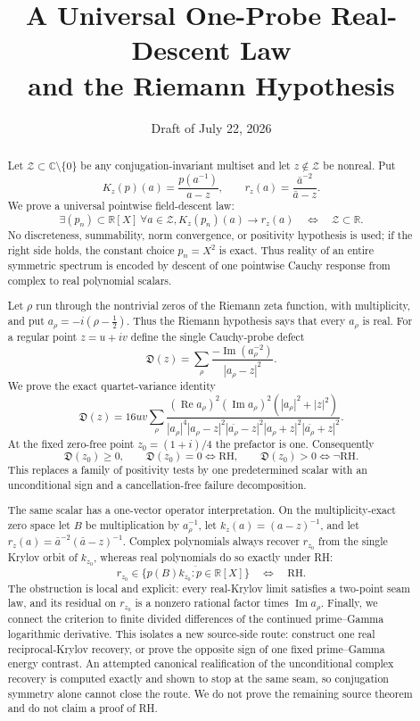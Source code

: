 \documentclass[11pt]{article}
\title{A Universal One-Probe Real-Descent Law\\
and the Riemann Hypothesis}
\author{}
\date{Draft of July 22, 2026}
\theoremstyle{definition}
\theoremstyle{remark}
\newcommand{\C}{\mathbb C}
\newcommand{\R}{\mathbb R}
\newcommand{\Rea}{\operatorname{Re}}
\newcommand{\Ima}{\operatorname{Im}}
\begin{document}
\maketitle

\begin{abstract}
Let $\mathcal Z\subset\C\setminus\{0\}$ be any conjugation-invariant multiset and let $z\notin
\mathcal Z$ be nonreal.  Put
\[
 K_z(p)(a)=\frac{p(a^{-1})}{a-z},
 \qquad
 r_z(a)=\frac{\bar a^{-2}}{\bar a-z}.
\]
We prove a universal pointwise field-descent law:
\[
 \exists (p_n)\subset\R[X]\ \forall a\in\mathcal Z,
       K_z(p_n)(a)\longrightarrow r_z(a)
 \quad\Longleftrightarrow\quad
 \mathcal Z\subset\R.
\]
No discreteness, summability, norm convergence, or positivity hypothesis is used; if the right
side holds, the constant choice $p_n=X^2$ is exact.  Thus reality of an entire symmetric spectrum
is encoded by descent of one pointwise Cauchy response from complex to real polynomial scalars.

Let $\rho$ run through the nontrivial zeros of the Riemann zeta function, with multiplicity, and
put $a_\rho=-i(\rho-\tfrac12)$.  Thus the Riemann hypothesis says that every $a_\rho$ is real.
For a regular point $z=u+iv$ define the single Cauchy-probe defect
\[
 \mathfrak D(z)=
 \sum_\rho\frac{-\Ima(a_\rho^{-2})}{|a_\rho-z|^2}.
\]
We prove the exact quartet-variance identity
\[
 \mathfrak D(z)=16uv\sum_\rho
 \frac{(\Rea a_\rho)^2(\Ima a_\rho)^2
       (|a_\rho|^2+|z|^2)}
 {|a_\rho|^4|a_\rho-z|^2|\overline{a_\rho}-z|^2
  |a_\rho+z|^2|\overline{a_\rho}+z|^2}.
\]
At the fixed zero-free point $z_0=(1+i)/4$ the prefactor is one.  Consequently
\[
 \mathfrak D(z_0)\geq0,
 \qquad
 \mathfrak D(z_0)=0\Longleftrightarrow\mathrm{RH},
 \qquad
 \mathfrak D(z_0)>0\Longleftrightarrow\neg\mathrm{RH}.
\]
This replaces a family of positivity tests by one predetermined scalar with an unconditional
sign and a cancellation-free failure decomposition.

The same scalar has a one-vector operator interpretation.  On the multiplicity-exact zero space
let $B$ be multiplication by $a_\rho^{-1}$, let
$k_z(a)=(a-z)^{-1}$, and let
$r_z(a)=\bar a^{-2}(\bar a-z)^{-1}$.  Complex polynomials always recover $r_{z_0}$ from the
single Krylov orbit of $k_{z_0}$, whereas real polynomials do so exactly under RH:
\[
 r_{z_0}\in\overline{\{p(B)k_{z_0}:p\in\R[X]\}}
 \quad\Longleftrightarrow\quad\mathrm{RH}.
\]
The obstruction is local and explicit: every real-Krylov limit satisfies a two-point seam law,
and its residual on $r_{z_0}$ is a nonzero rational factor times $\Ima a_\rho$.
Finally, we connect the criterion to finite divided differences of the continued
prime--Gamma logarithmic derivative.  This isolates a new source-side route: construct one real
reciprocal-Krylov recovery, or prove the opposite sign of one fixed prime--Gamma energy contrast.
An attempted canonical realification of the unconditional complex recovery is computed exactly
and shown to stop at the same seam, so conjugation symmetry alone cannot close the route.  We do
not prove the remaining source theorem and do not claim a proof of RH.
\end{abstract}
\end{document}
